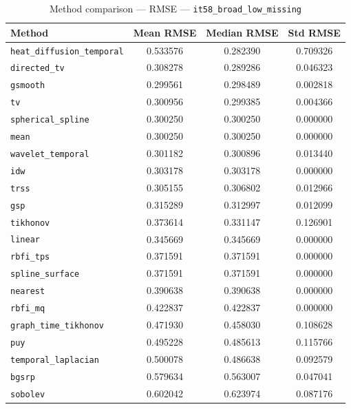 \begin{table}[ht]
\centering
\caption{Method comparison — RMSE — \texttt{it58_broad_low_missing}}
\label{tab:rmse_it58_broad_low_missing}
\begin{tabular}{lccc}
\hline
Method & Mean RMSE & Median RMSE & Std RMSE \\
\hline
\texttt{heat_diffusion_temporal} & 0.533576 & 0.282390 & 0.709326 \\
\texttt{directed_tv} & 0.308278 & 0.289286 & 0.046323 \\
\texttt{gsmooth} & 0.299561 & 0.298489 & 0.002818 \\
\texttt{tv} & 0.300956 & 0.299385 & 0.004366 \\
\texttt{spherical_spline} & 0.300250 & 0.300250 & 0.000000 \\
\texttt{mean} & 0.300250 & 0.300250 & 0.000000 \\
\texttt{wavelet_temporal} & 0.301182 & 0.300896 & 0.013440 \\
\texttt{idw} & 0.303178 & 0.303178 & 0.000000 \\
\texttt{trss} & 0.305155 & 0.306802 & 0.012966 \\
\texttt{gsp} & 0.315289 & 0.312997 & 0.012099 \\
\texttt{tikhonov} & 0.373614 & 0.331147 & 0.126901 \\
\texttt{linear} & 0.345669 & 0.345669 & 0.000000 \\
\texttt{rbfi_tps} & 0.371591 & 0.371591 & 0.000000 \\
\texttt{spline_surface} & 0.371591 & 0.371591 & 0.000000 \\
\texttt{nearest} & 0.390638 & 0.390638 & 0.000000 \\
\texttt{rbfi_mq} & 0.422837 & 0.422837 & 0.000000 \\
\texttt{graph_time_tikhonov} & 0.471930 & 0.458030 & 0.108628 \\
\texttt{puy} & 0.495228 & 0.485613 & 0.115766 \\
\texttt{temporal_laplacian} & 0.500078 & 0.486638 & 0.092579 \\
\texttt{bgsrp} & 0.579634 & 0.563007 & 0.047041 \\
\texttt{sobolev} & 0.602042 & 0.623974 & 0.087176 \\
\hline
\end{tabular}
\end{table}
